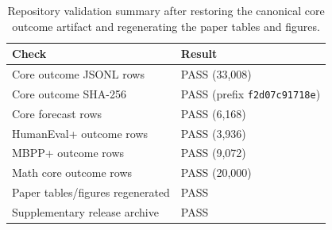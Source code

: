 
\begin{table}[t]
\centering
\small
\caption{Repository validation summary after restoring the canonical core outcome artifact and regenerating the paper tables and figures.}
\label{tab:validation}
\begin{tabular}{ll}
\toprule
Check & Result \\
\midrule
Core outcome JSONL rows & PASS (33,008) \\
Core outcome SHA-256 & PASS (prefix \texttt{f2d07c91718e}) \\
Core forecast rows & PASS (6,168) \\
HumanEval+ outcome rows & PASS (3,936) \\
MBPP+ outcome rows & PASS (9,072) \\
Math core outcome rows & PASS (20,000) \\
Paper tables/figures regenerated & PASS \\
Supplementary release archive & PASS \\
\bottomrule
\end{tabular}
\end{table}
